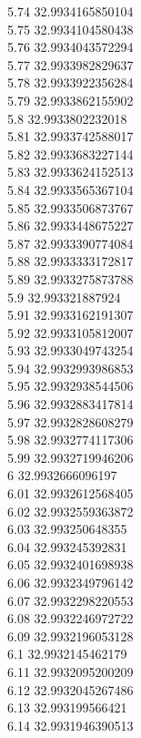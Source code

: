 {5.74	32.9934165850104\\
5.75	32.9934104580438\\
5.76	32.9934043572294\\
5.77	32.9933982829637\\
5.78	32.9933922356284\\
5.79	32.9933862155902\\
5.8	32.9933802232018\\
5.81	32.9933742588017\\
5.82	32.9933683227144\\
5.83	32.9933624152513\\
5.84	32.9933565367104\\
5.85	32.9933506873767\\
5.86	32.9933448675227\\
5.87	32.9933390774084\\
5.88	32.9933333172817\\
5.89	32.9933275873788\\
5.9	32.993321887924\\
5.91	32.9933162191307\\
5.92	32.9933105812007\\
5.93	32.9933049743254\\
5.94	32.9932993986853\\
5.95	32.9932938544506\\
5.96	32.9932883417814\\
5.97	32.9932828608279\\
5.98	32.9932774117306\\
5.99	32.9932719946206\\
6	32.9932666096197\\
6.01	32.9932612568405\\
6.02	32.9932559363872\\
6.03	32.993250648355\\
6.04	32.993245392831\\
6.05	32.9932401698938\\
6.06	32.9932349796142\\
6.07	32.9932298220553\\
6.08	32.9932246972722\\
6.09	32.9932196053128\\
6.1	32.9932145462179\\
6.11	32.9932095200209\\
6.12	32.9932045267486\\
6.13	32.993199566421\\
6.14	32.9931946390513\\
}

